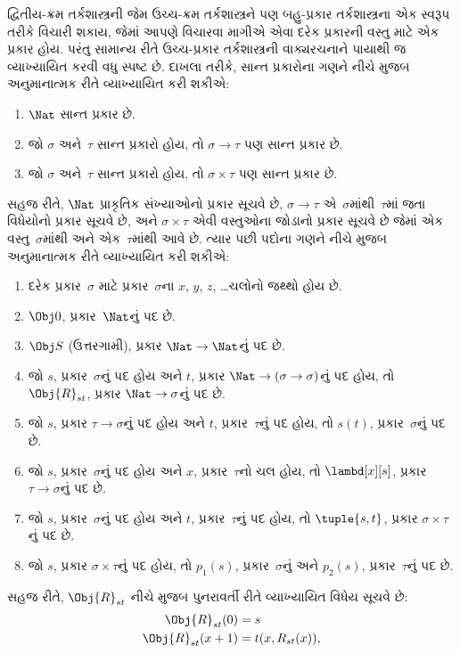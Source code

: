 દ્વિતીય-ક્રમ તર્કશાસ્ત્રની જેમ ઉચ્ચ-ક્રમ તર્કશાસ્ત્રને પણ બહુ-પ્રકાર
તર્કશાસ્ત્રના એક સ્વરૂપ તરીકે વિચારી શકાય, જેમાં આપણે વિચારવા માગીએ
એવા દરેક પ્રકારની વસ્તુ માટે એક પ્રકાર હોય. પરંતુ સામાન્ય રીતે
ઉચ્ચ-પ્રકાર તર્કશાસ્ત્રની વાક્યરચનાને પાયાથી જ વ્યાખ્યાયિત કરવી વધુ
સ્પષ્ટ છે. દાખલા તરીકે, સાન્ત પ્રકારોના ગણને નીચે મુજબ અનુમાનાત્મક રીતે
વ્યાખ્યાયિત કરી શકીએ:
\begin{enumerate}
\item $\Nat$ સાન્ત પ્રકાર છે.
\item જો $\sigma$ અને~$\tau$ સાન્ત પ્રકારો હોય, તો $\sigma
  \to \tau$ પણ સાન્ત પ્રકાર છે.
\item જો $\sigma$ અને~$\tau$ સાન્ત પ્રકારો હોય, તો $\sigma \times
  \tau$ પણ સાન્ત પ્રકાર છે.
\end{enumerate}
સહજ રીતે, $\Nat$ પ્રાકૃતિક સંખ્યાઓનો પ્રકાર સૂચવે છે,
$\sigma \to \tau$ એ~$\sigma$માંથી~$\tau$માં જતા વિધેયોનો પ્રકાર
સૂચવે છે, અને $\sigma \times \tau$ એવી વસ્તુઓના જોડાનો પ્રકાર સૂચવે
છે જેમાં એક વસ્તુ~$\sigma$માંથી અને એક~$\tau$માંથી આવે છે. ત્યાર પછી
પદોના ગણને નીચે મુજબ અનુમાનાત્મક રીતે વ્યાખ્યાયિત કરી શકીએ:
\begin{enumerate}
\item દરેક પ્રકાર~$\sigma$ માટે પ્રકાર~$\sigma$ના $x$, $y$, $z$, \dots ચલોનો
  જથ્થો હોય છે.
\item $\Obj 0$, પ્રકાર~$\Nat$નું પદ છે.
\item $\Obj S$ (ઉત્તરગામી), પ્રકાર $\Nat \to \Nat$નું પદ છે.
\item જો $s$, પ્રકાર~$\sigma$નું પદ હોય અને $t$, પ્રકાર
  $\Nat \to (\sigma \to \sigma)$નું પદ હોય, તો $\Obj{R}_{st}$,
  પ્રકાર $\Nat \to \sigma$નું પદ છે.
\item જો $s$, પ્રકાર $\tau \to \sigma$નું પદ હોય અને $t$,
  પ્રકાર~$\tau$નું પદ હોય, તો $s(t)$, પ્રકાર~$\sigma$નું પદ છે.
\item જો $s$, પ્રકાર~$\sigma$નું પદ હોય અને $x$, પ્રકાર~$\tau$નો ચલ
  હોય, તો $\lambd[x][s]$, પ્રકાર $\tau \to \sigma$નું પદ છે.
\item જો $s$, પ્રકાર~$\sigma$નું પદ હોય અને $t$, પ્રકાર~$\tau$નું પદ
  હોય, તો $\tuple{s, t}$, પ્રકાર $\sigma \times \tau$નું પદ છે.
\item જો $s$, પ્રકાર $\sigma \times \tau$નું પદ હોય, તો $p_1(s)$,
  પ્રકાર~$\sigma$નું અને $p_2(s)$, પ્રકાર~$\tau$નું પદ છે.
\end{enumerate}
સહજ રીતે, $\Obj{R}_{st}$ નીચે મુજબ પુનરાવર્તી રીતે વ્યાખ્યાયિત વિધેય
સૂચવે છે:
\begin{align*}
\Obj{R}_{st}(0) & = s \\
\Obj{R}_{st}(x+1) & = t(x, R_{st}(x)),
\end{align*}
